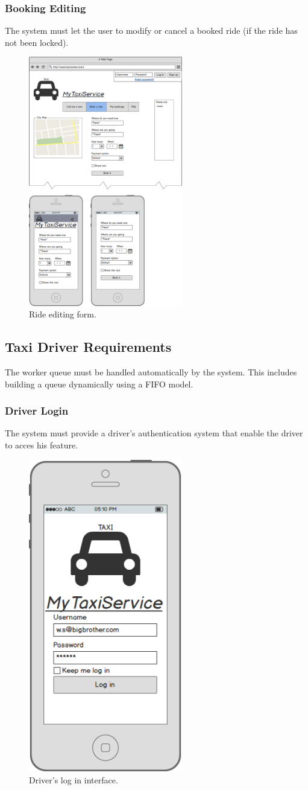 		\subsubsection {Booking Editing}
			The system must let the user to modify or cancel a booked ride (if the ride has not been locked).
			\begin{figure}[h!]
				\includegraphics[width=0.6\textwidth]{mockup/bookride}
				\caption{Ride editing form.}
			\end{figure}
			\newpage
	\subsection {Taxi Driver Requirements}
		The worker queue must be handled automatically by the system. This includes building a queue dynamically using a FIFO model.
		\subsubsection {Driver Login}
		 	The system must provide a driver's authentication system that enable the driver to acces his feature.
		 	\begin{figure}[h!]
				\includegraphics[width=0.6\textwidth, width=3cm]{mockup/driverlogin}
				\caption{Driver's log in interface.}
			\end{figure}
			\newpage
